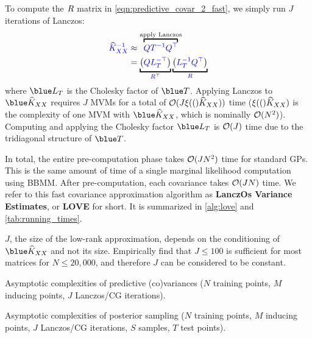 To compute the $R$ matrix in \cref{eqn:predictive_covar_2_fast}, we simply run $J$ iterations of Lanczos:
\begin{align*}
  {\color{blue} \trainK^{-1}} &\approx \overbracket{\color{blue} \bQ \bT^{-1} \bQ^\top}^{\text{apply Lanczos}}
  \\
  &=
  \underbracket{ \left( {\color{blue} \bQ \bL_\bT^{-\top}} \right)}_{\color{blue} \bR^\top}
  \underbracket{ \left( {\color{blue} \bL_\bT^{-1} \bQ^\top} \right)}_{\color{blue} \bR}
\end{align*}
%
where $\blue \bL_\bT$ is the Cholesky factor of $\blue \bT$.
Applying Lanczos to $\blue \trainK$ requires $J$ MVMs for a total of $\bigo{J \mvm(\trainK)}$ time ($\xi ( ( )\widehat{K}_{XX})$ is the complexity of one MVM with $\blue \trainK$, which is nominally $\bigo{N^2}$).
Computing and applying the Cholesky factor $\blue \bL_\bT$ is $\bigo{J}$ time due to the tridiagonal structure of $\blue \bT$.

In total, the entire pre-computation phase takes $\bigo{J N^2}$ time for standard GPs.
This is the same amount of time of a single marginal likelihood computation using BBMM.
After pre-computation, each covariance takes $\bigo{JN}$ time.
We refer to this fast covariance approximation algorithm as {\bf LanczOs Variance Estimates}, or {\bf LOVE} for short.
It is summarized in \cref{alg:love} and \cref{tab:running_times}.

$J$, the size of the low-rank approximation, depends on the conditioning of $\blue \trainK$ and not its size.
Empirically find that $J\leq100$ is sufficient for most matrices for $N \leq 20,\!000$, and therefore $J$ can be considered to be constant.



\begin{table*}[t!]
  \caption[Asymptotic complexities of predictive (co)variances with LOVE verses other methods.]{
    Asymptotic complexities of predictive (co)variances ($N$ training points, $M$ inducing points, $J$ Lanczos/CG iterations).
    \label{tab:running_times}
  }
  \vspace{0.5ex}
  \centering
  \resizebox{\textwidth}{!}{%
    
  }
  \vspace{-2ex}
\end{table*}

\begin{table*}[t!]
  \caption[Asymptotic complexities of posterior sampling with LOVE + KISS-GP verses other methods.]{
    Asymptotic complexities of posterior sampling
		($N$ training points, $M$ inducing points, $J$ Lanczos/CG iterations, $S$ samples, $T$ test points).
    \label{tab:running_times_sampling}
  }
  \vspace{0.5ex}
  \centering
  \resizebox{\textwidth}{!}{%
    
  }
  \vspace{-2ex}
\end{table*}


